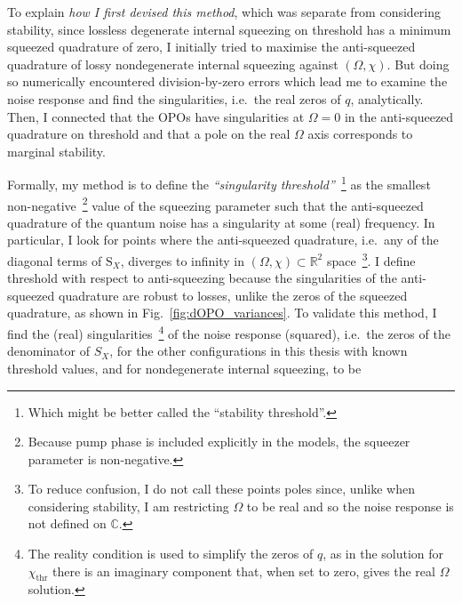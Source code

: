 To explain \emph{how I first devised this method}, which was separate from considering stability, since lossless degenerate internal squeezing on threshold has a minimum squeezed quadrature of zero, I initially tried to maximise the anti-squeezed quadrature of lossy nondegenerate internal squeezing against $(\Omega,\chi)$. But doing so numerically encountered division-by-zero errors which lead me to examine the noise response and find the singularities, i.e.\ the real zeros of $q$, analytically. Then, I connected that the OPOs have singularities at $\Omega=0$ in the anti-squeezed quadrature on threshold and that a pole on the real $\Omega$ axis corresponds to marginal stability.

Formally, my method is to define the \emph{``singularity threshold''}~\footnote{Which might be better called the ``stability threshold''.} as the smallest non-negative~\footnote{Because pump phase is included explicitly in the models, the squeezer parameter is non-negative.} value of the squeezing parameter such that the anti-squeezed quadrature of the quantum noise has a singularity at some (real) frequency. In particular, I look for points where the anti-squeezed quadrature, i.e.\ any of the diagonal terms of $\text{S}_X$, diverges to infinity in $(\Omega,\chi)\subset\mathbb{R}^2$ space~\footnote{To reduce confusion, I do not call these points poles since, unlike when considering stability, I am restricting $\Omega$ to be real and so the noise response is not defined on $\mathbb{C}$.}. %
I define threshold with respect to anti-squeezing because the singularities of the anti-squeezed quadrature are robust to losses, unlike the zeros of the squeezed quadrature, as shown in Fig.~\ref{fig:dOPO_variances}. 
To validate this method, I find the (real) singularities~\footnote{The reality condition is used to simplify the zeros of $q$, as in the solution for $\chi_\text{thr}$ there is an imaginary component that, when set to zero, gives the real $\Omega$ solution.} of the noise response (squared), i.e.\ the zeros of the denominator of $S_X$, for the other configurations in this thesis with known threshold values, and for nondegenerate internal squeezing, to be
\begingroup
\allowdisplaybreaks

